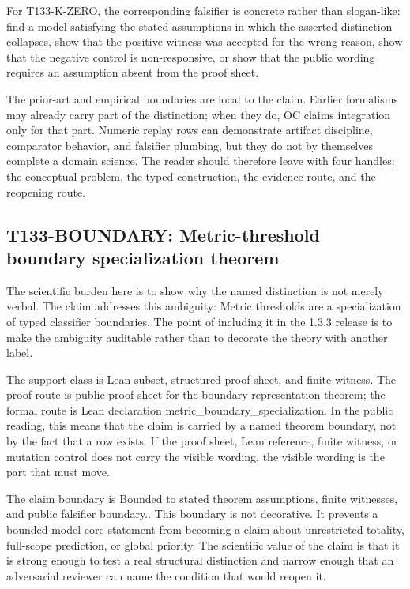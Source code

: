 For T133-K-ZERO, the corresponding falsifier is concrete rather than slogan-like: find a model satisfying the stated assumptions in which the asserted distinction collapses, show that the positive witness was accepted for the wrong reason, show that the negative control is non-responsive, or show that the public wording requires an assumption absent from the proof sheet.

The prior-art and empirical boundaries are local to the claim. Earlier formalisms may already carry part of the distinction; when they do, OC claims integration only for that part. Numeric replay rows can demonstrate artifact discipline, comparator behavior, and falsifier plumbing, but they do not by themselves complete a domain science. The reader should therefore leave with four handles: the conceptual problem, the typed construction, the evidence route, and the reopening route.

\subsection{T133-BOUNDARY: Metric-threshold boundary specialization theorem}
The scientific burden here is to show why the named distinction is not merely verbal. The claim addresses this ambiguity: Metric thresholds are a specialization of typed classifier boundaries. The point of including it in the 1.3.3 release is to make the ambiguity auditable rather than to decorate the theory with another label.

The support class is Lean subset, structured proof sheet, and finite witness. The proof route is public proof sheet for the boundary representation theorem; the formal route is Lean declaration metric\_boundary\_specialization. In the public reading, this means that the claim is carried by a named theorem boundary, not by the fact that a row exists. If the proof sheet, Lean reference, finite witness, or mutation control does not carry the visible wording, the visible wording is the part that must move.

The claim boundary is Bounded to stated theorem assumptions, finite witnesses, and public falsifier boundary.. This boundary is not decorative. It prevents a bounded model-core statement from becoming a claim about unrestricted totality, full-scope prediction, or global priority. The scientific value of the claim is that it is strong enough to test a real structural distinction and narrow enough that an adversarial reviewer can name the condition that would reopen it.

